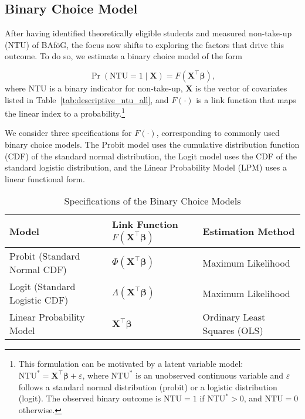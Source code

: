 %
%
\subsection{Binary Choice Model}

After having identified theoretically eligible students and measured non-take-up (NTU) of BAföG, the focus now shifts to exploring the factors that drive this outcome. To do so, we estimate a binary choice model of the form

\begin{equation}
  \Pr(\mathrm{NTU} = 1 \mid \mathbf{X}) = F(\mathbf{X}^\top \boldsymbol{\beta}),
\end{equation}
where \( \mathrm{NTU} \) is a binary indicator for non-take-up, \( \mathbf{X} \) is the vector of covariates listed in Table~\ref{tab:descriptive_ntu_all}, and \( F(\cdot) \) is a link function that maps the linear index to a probability.\footnote{
This formulation can be motivated by a latent variable model: \( \mathrm{NTU}^* = \mathbf{X}^\top \boldsymbol{\beta} + \varepsilon \), where \( \mathrm{NTU}^* \) is an unobserved continuous variable and \( \varepsilon \) follows a standard normal distribution (probit) or a logistic distribution (logit). The observed binary outcome is \( \mathrm{NTU} = 1 \) if \( \mathrm{NTU}^* > 0 \), and \( \mathrm{NTU} = 0 \) otherwise.
}

We consider three specifications for \( F(\cdot) \), corresponding to commonly used binary choice models. 
The Probit model uses the cumulative distribution function (CDF) of the standard normal distribution, the Logit model uses the CDF of the standard logistic distribution, and the Linear Probability Model (LPM) uses a linear functional form.

\begin{table}[H]
\footnotesize
\centering
\begin{tabular}{@{}lll@{}}
\toprule
\textbf{Model} & \textbf{Link Function \( F(\mathbf{X}^\top \boldsymbol{\beta}) \)} & \textbf{Estimation Method} \\ \midrule
Probit (Standard Normal CDF) & \( \Phi(\mathbf{X}^\top \boldsymbol{\beta}) \) & Maximum Likelihood \\
Logit (Standard Logistic CDF) & \( \Lambda(\mathbf{X}^\top \boldsymbol{\beta}) \) & Maximum Likelihood \\
Linear Probability Model & \( \mathbf{X}^\top \boldsymbol{\beta} \) & Ordinary Least Squares (OLS) \\
\bottomrule
\end{tabular}
\caption{Specifications of the Binary Choice Models}
\end{table}

